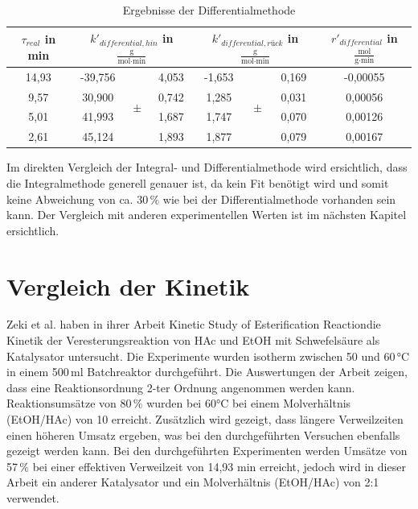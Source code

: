 \documentclass[12pt,liststotoc]{report}
\begin{document}
\begin{table}[htbp]
  \centering
  \caption{Ergebnisse der Differentialmethode}
    \begin{tabular}{c|ccc|ccc|c}
    \toprule
    \multicolumn{1}{c|}{$\tau_{real}$ in min} & \multicolumn{3}{c|}{$k'_{differential, hin}$ in $\frac{\text{g}}{\text{mol}\cdot\text{min}}$} & \multicolumn{3}{c|}{$k'_{differential, rück}$ in $\frac{\text{g}}{\text{mol}\cdot\text{min}}$} & \multicolumn{1}{c}{$r'_{differential}$ in $\frac{\text{mol}}{\text{g}\cdot\text{min}}$} \\
    \midrule
    14,93 & -39,756 & \multirow{4}[1]{*}{$\pm$} & 4,053 & -1,653 & \multirow{4}[1]{*}{$\pm$} & 0,169 & -0,00055 \\
    9,57  & 30,900 &       & 0,742 & 1,285 &       & 0,031 & 0,00056 \\
    5,01  & 41,993 &       & 1,687 & 1,747 &       & 0,070 & 0,00126 \\
    2,61  & 45,124 &       & 1,893 & 1,877 &       & 0,079 & 0,00167 \\
    \bottomrule
    \end{tabular}%
  \label{tab:ergebnissedifferential}%
\end{table}%
\noindent
Im direkten Vergleich der Integral- und Differentialmethode wird ersichtlich, dass die Integralmethode generell genauer ist, da kein Fit benötigt wird und somit keine Abweichung von ca. 30\,$\%$ wie bei der Differentialmethode vorhanden sein kann. Der Vergleich mit anderen experimentellen Werten ist im nächsten Kapitel ersichtlich.

\section{Vergleich der Kinetik}

Zeki et al. \cite{zeki2018kinetic} haben in ihrer Arbeit \glqq Kinetic Study of Esterification Reaction\grqq\;die Kinetik der Veresterungsreaktion von HAc und EtOH mit Schwefelsäure als Katalysator untersucht. Die Experimente wurden isotherm zwischen 50 und 60\,°C in einem 500\,ml Batchreaktor durchgeführt. Die Auswertungen der Arbeit zeigen, dass eine Reaktionsordnung 2-ter Ordnung angenommen werden kann. Reaktionsumsätze von 80\,\% wurden bei 60°C bei einem Molverhältnis (EtOH/HAc) von 10 erreicht. Zusätzlich wird gezeigt, dass längere Verweilzeiten einen höheren Umsatz ergeben, was bei den durchgeführten Versuchen ebenfalls gezeigt werden kann. Bei den durchgeführten Experimenten werden Umsätze von 57\,\% bei einer effektiven Verweilzeit von 14,93 min erreicht, jedoch wird in dieser Arbeit ein anderer Katalysator und ein Molverhältnis (EtOH/HAc) von 2:1 verwendet.
\end{document}

